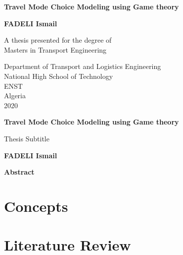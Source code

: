 \documentclass[12pt]{report}
\begin{document}
\begin{titlepage}
   \begin{center}
       \vspace*{1cm}
 	   \Huge
       \textbf{Travel Mode Choice Modeling using Game theory}
		\LARGE
		
       \vspace{0.5cm}
        
            
       \vspace{1.5cm}

       \textbf{FADELI Ismail}

       \vfill
            	\normalsize
       A thesis presented for the degree of\\
       Masters in Transport Engineering
            
       \vspace{0.8cm}
     
       
            \Large
       Department of Transport and Logistics Engineering\\
       National High School of Technology \\
       ENST\\
       Algeria\\
       2020
            
   \end{center}
\end{titlepage}
\thispagestyle{plain}
\begin{center}
    \Large
    \textbf{Travel Mode Choice Modeling using Game theory}
        
    \vspace{0.4cm}
    \large
    Thesis Subtitle
        
    \vspace{0.4cm}
    \textbf{FADELI Ismail}
       
    \vspace{0.9cm}
    \textbf{Abstract}
\end{center}

\tableofcontents
{}
\listoffigures
\listoftables
\clearpage


\chapter{Concepts}

\chapter{Literature Review} 

\end{document}
